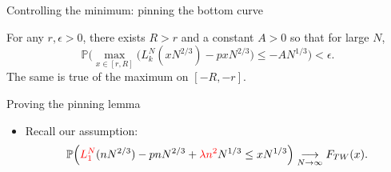 \documentclass[9pt,t]{beamer}
\begin{document}
\begin{frame}{Controlling the minimum: pinning the bottom curve}
	
	\begin{lemma}[------]
		For any $r,\epsilon > 0$, there exists $R>r$ and a constant $A>0$ so that for large $N$,
		\[
		\mathbb{P}\Big(\max_{x\in[r,R]} \big(L_k^N(xN^{2/3}) - pxN^{2/3}\big) \leq -AN^{1/3}\Big) < \epsilon.
		\]
		The same is true of the maximum on $[-R,-r]$.
	\end{lemma}
	
	
	
\end{frame}

\begin{frame}{Proving the pinning lemma}
	
	\begin{itemize}
		
		\item Recall our assumption:
		\[
		\mathbb{P}\Big(\textcolor{red}{L_1^N}(nN^{2/3}) - pnN^{2/3} + \textcolor{red}{\lambda n^2} N^{1/3} \leq xN^{1/3}\Big) \underset{N\to\infty}\longrightarrow F_{TW}(x).
		\]
		
	\end{itemize}
\end{frame}
\end{document}
